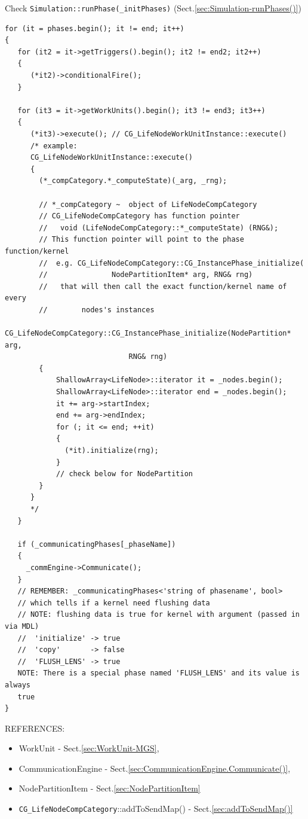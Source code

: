 Check \verb!Simulation::runPhase(_initPhases)! (Sect.\ref{sec:Simulation-runPhases()})
\begin{verbatim}
for (it = phases.begin(); it != end; it++)
{
   for (it2 = it->getTriggers().begin(); it2 != end2; it2++)
   {
      (*it2)->conditionalFire();
   }
   
   for (it3 = it->getWorkUnits().begin(); it3 != end3; it3++)
   {
      (*it3)->execute(); // CG_LifeNodeWorkUnitInstance::execute()
      /* example:
      CG_LifeNodeWorkUnitInstance::execute()
      {
        (*_compCategory.*_computeState)(_arg, _rng);
        
        // *_compCategory ~  object of LifeNodeCompCategory
        // CG_LifeNodeCompCategory has function pointer
        //   void (LifeNodeCompCategory::*_computeState) (RNG&);
        // This function pointer will point to the phase function/kernel
        //  e.g. CG_LifeNodeCompCategory::CG_InstancePhase_initialize(
        //               NodePartitionItem* arg, RNG& rng)
        //   that will then call the exact function/kernel name of every
        //        nodes's instances
        CG_LifeNodeCompCategory::CG_InstancePhase_initialize(NodePartition* arg,
                             RNG& rng)
        {
            ShallowArray<LifeNode>::iterator it = _nodes.begin();
            ShallowArray<LifeNode>::iterator end = _nodes.begin();
            it += arg->startIndex;
            end += arg->endIndex;
            for (; it <= end; ++it)
            {
              (*it).initialize(rng);
            }
            // check below for NodePartition
        }          
      }
      */
   }
   
   if (_communicatingPhases[_phaseName])
   {
     _commEngine->Communicate(); 
   }
   // REMEMBER: _communicatingPhases<'string of phasename', bool>
   // which tells if a kernel need flushing data
   // NOTE: flushing data is true for kernel with argument (passed in via MDL)
   //  'initialize' -> true
   //  'copy'       -> false
   //  'FLUSH_LENS' -> true
   NOTE: There is a special phase named 'FLUSH_LENS' and its value is always
   true
}
\end{verbatim}

REFERENCES:
\begin{itemize}
  \item  WorkUnit - Sect.\ref{sec:WorkUnit-MGS}, 
  
  \item CommunicationEngine - Sect.\ref{sec:CommunicationEngine.Communicate()},
  
  \item NodePartitionItem - Sect.\ref{sec:NodePartitionItem}
  
  \item \verb!CG_LifeNodeCompCategory!::addToSendMap() -
  Sect.\ref{sec:addToSendMap()}
\end{itemize}

